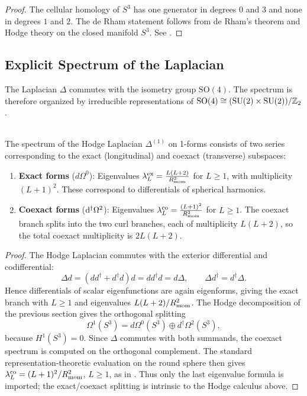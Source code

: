 \documentclass[11pt]{article}
\begin{document}
\begin{proof}
The cellular homology of \(S^3\) has one generator in degrees \(0\) and \(3\) and none in degrees \(1\) and \(2\). The de Rham statement follows from de Rham's theorem and Hodge theory on the closed manifold \(S^3\). See \cite{hatcher2002algebraic}.
\end{proof}


\subsection{Explicit Spectrum of the Laplacian}

The Laplacian $\Delta$ commutes with the isometry group $\mathrm{SO}(4)$. The spectrum is therefore organized by irreducible representations of $\mathrm{SO}(4) \cong (\mathrm{SU}(2) \times \mathrm{SU}(2))/\mathbb{Z}_2$.

\begin{theorem}
\label{p1:thm:hodge-one-form-spectrum}
\mbox{}\\[6pt] 
The spectrum of the Hodge Laplacian $\Delta^{(1)}$ on 1-forms consists of two series corresponding to the exact (longitudinal) and coexact (transverse) subspaces:
\begin{enumerate}
\item \textbf{Exact forms} ($d\Omega^0$): Eigenvalues $\lambda_L^{\text{ex}} = \frac{L(L+2)}{R_{\mathrm{mom}}^2}$ for $L \geq 1$, with multiplicity $(L+1)^2$. These correspond to differentials of spherical harmonics.
\item \textbf{Coexact forms} ($\mathrm{d}^{\dagger}\Omega^2$): Eigenvalues $\lambda_L^{\text{co}} = \frac{(L+1)^2}{R_{\mathrm{mom}}^2}$ for $L \geq 1$. The coexact branch splits into the two curl branches, each of multiplicity $L(L+2)$, so the total coexact multiplicity is $2L(L+2)$.
\end{enumerate}
\cite{ikedaTaniguchi1978eigenforms}
\end{theorem}

\begin{proof}
The Hodge Laplacian commutes with the exterior differential and codifferential:
\[
\Delta d=(dd^\dagger+d^\dagger d)d=d d^\dagger d=d\Delta,
\qquad
\Delta d^\dagger=d^\dagger\Delta.
\]
Hence differentials of scalar eigenfunctions are again eigenforms, giving the exact branch with
\(L\ge1\) and eigenvalues \(L(L+2)/R_{\mathrm{mom}}^2\).  The Hodge decomposition of the previous section gives the
orthogonal splitting
\[
\Omega^1(S^3)=d\Omega^0(S^3)\oplus d^\dagger\Omega^2(S^3),
\]
because \(H^1(S^3)=0\).  Since \(\Delta\) commutes with both summands, the coexact spectrum is computed on the
orthogonal complement.  The standard representation-theoretic evaluation on the round sphere then gives
\(\lambda_L^{\rm co}=(L+1)^2/R_{\mathrm{mom}}^2\), \(L\ge1\), as in \cite{ikedaTaniguchi1978eigenforms}.  Thus only the
last eigenvalue formula is imported; the exact/coexact splitting is intrinsic to the Hodge calculus above.
\end{proof}
\end{document}
